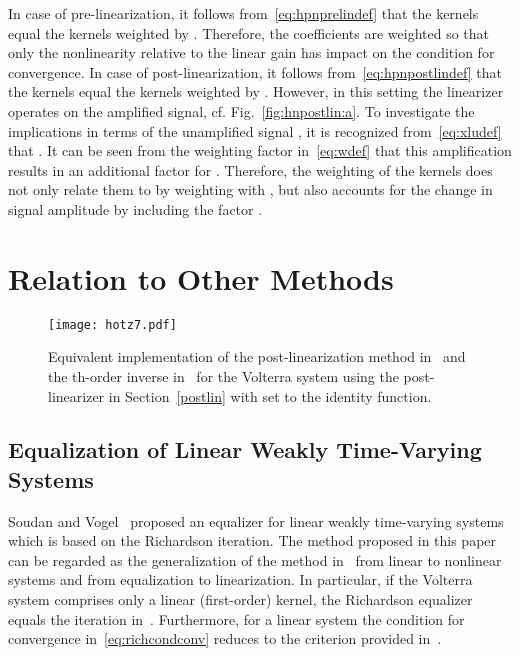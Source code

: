\documentclass[10pt,twocolumn,twoside]{IEEEtran}
\begin{document}
In case of pre-linearization, it follows from~\eqref{eq:hpnprelindef}
that the kernels  equal the kernels  weighted by .
Therefore, the coefficients are weighted so that only the nonlinearity
relative to the linear gain has impact on the condition for convergence.
In case of post-linearization, it follows from~\eqref{eq:hpnpostlindef} that the
kernels  equal the kernels  weighted by .
However, in this setting the linearizer operates on the amplified signal,
cf. Fig.~\ref{fig:hnpostlin:a}. To investigate the implications in terms
of the unamplified signal , it is recognized from~\eqref{eq:xludef}
that . It can be seen from the
weighting factor in~\eqref{eq:wdef} that this amplification results in
an additional factor  for . Therefore, the weighting
of the kernels  does not only relate them to  by
weighting with , but also accounts for the change in signal amplitude by
including the factor .


\section{Relation to Other Methods}
	\label{relation}

\begin{figure}[!t]
	\centering
	\texttt{[image: hotz7.pdf]}
	\caption{
		Equivalent implementation of the post-linearization method in~\cite{nowak1997}
		and the th-order inverse in~\cite{kafka2002} for the Volterra system
		 using the post-linearizer in Section~\ref{postlin} with
		 set to the identity function.}
	\label{fig:nowakvsrich}
\end{figure}


\subsection{Equalization of Linear Weakly Time-Varying Systems}
	\label{relation:ltveq}

Soudan and Vogel~\cite{soudan2012} proposed an equalizer for linear weakly time-varying systems
which is based on the Richardson iteration. The method proposed in this paper
can be regarded as the generalization of the method in~\cite{soudan2012} from linear
to nonlinear systems and from equalization to linearization. In particular, if the
Volterra system  comprises only a linear (first-order) kernel, the
Richardson equalizer equals the iteration in~\cite{soudan2012}. Furthermore,
for a linear system the condition for convergence in~\eqref{eq:richcondconv} reduces to the
criterion provided in~\cite{soudan2012}.
\end{document}
